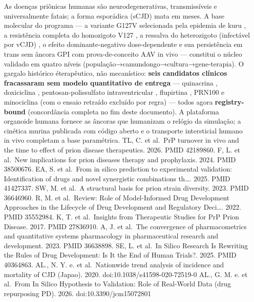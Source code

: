 \documentclass[12pt,a4paper,oneside]{report}
\begin{document}
As doenças priônicas humanas são neurodegenerativas, transmissíveis e
universalmente fatais; a forma esporádica (sCJD) mata em meses. A base
molecular do programa --- a variante G127V selecionada pela epidemia de
kuru \cite{e6}, a resistência completa do homozigoto V127 \cite{e1}, a
ressalva do heterozigoto (infectável por vCJD) \cite{e1}, o efeito
dominante-negativo dose-dependente \cite{e1}\cite{e3}\cite{e5} e sua
persistência em trans sem âncora GPI \cite{e3} com prova-de-conceito AAV
in vivo \cite{e4} --- constitui o núcleo validado em quatro níveis
(população→camundongo→cultura→gene-terapia). O gargalo histórico
éterapêutico, não mecanístico: \textbf{seis candidatos clínicos
fracassaram sem modelo quantitativo de entrega} --- quinacrina
\cite{e35}, doxiciclina \cite{e36}, pentosan-polissulfato
intraventricular \cite{e37}, flupirtina \cite{e38}, PRN100 \cite{e34} e
minociclina \cite{e33} (com o ensaio retraído \cite{e21} excluído por
regra) --- todos agora \textbf{registry-bound} (concordância completa no
fim deste documento). A plataforma organoide humana \cite{e7}\cite{e8}
fornece as âncoras que humanizam o relógio da simulação; a cinética
murina publicada com código aberto \cite{e9} e o transporte intersticial
humano in vivo \cite{e10} completam a base paramétrica. \cite{e39} TL,
C. et al.~PrP turnover in vivo and the time to effect of prion disease
therapeutics. 2026. PMID 42189860. \cite{e40} F, L. et al.~New
implications for prion diseases therapy and prophylaxis. 2024. PMID
38500676. \cite{e41} EA, S. et al.~From in silico prediction to
experimental validation: Identification of drugs and novel synergistic
combinations th\ldots. 2025. PMID 41427337. \cite{e42} SW, M. et al.~A
structural basis for prion strain diversity. 2023. PMID 36646960.
\cite{e43} R, M. et al.~Review: Role of Model-Informed Drug Development
Approaches in the Lifecycle of Drug Development and Regulatory
Deci\ldots. 2022. PMID 35552984. \cite{e44} K, T. et al.~Insights from
Therapeutic Studies for PrP Prion Disease. 2017. PMID 27836910.
\cite{e45} A, J. et al.~The convergence of pharmacometrics and
quantitative systems pharmacology in pharmaceutical research and
development. 2023. PMID 36638898. \cite{e46} SE, L. et al.~In Silico
Research Is Rewriting the Rules of Drug Development: Is It the End of
Human Trials?. 2025. PMID 40364863. \cite{e47} AL., N. Y. e. et
al.~Nationwide trend analysis of incidence and mortality of CJD (Japao).
2020. doi:10.1038/s41598-020-72519-0 \cite{e48} AL., G. M. e. et
al.~From In Silico Hypothesis to Validation: Role of Real-World Data
(drug repurposing PD). 2026. doi:10.3390/jcm15072801 \cite{e49}
\end{document}
